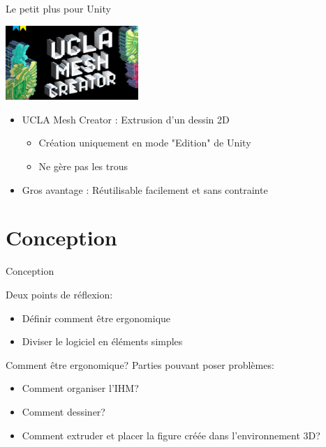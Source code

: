 \documentclass[a4paper,10pt]{beamer}
\begin{document}
		\begin{frame}{Le petit plus pour Unity}
			\centerline{\includegraphics[height=80pt]{images/techno/ucla.jpg}}
			
			\begin{itemize}
				\item UCLA Mesh Creator : Extrusion d'un dessin 2D
					\begin{itemize}
						\item Création uniquement en mode "Edition" de Unity
						\item Ne gère pas les trous
					\end{itemize}
				\item Gros avantage : Réutilisable facilement et sans contrainte
			\end{itemize}
			
		\end{frame}
		

	
	\section{Conception}	
		\begin{frame}{Conception}
		
		Deux points de réflexion:
			\begin{itemize}
				  \item Définir comment être ergonomique
				  \item Diviser le logiciel en éléments simples
			\end{itemize}
		\end{frame}
		
		
		\begin{frame}{Comment être ergonomique?}
				Parties pouvant poser problèmes:
				
				\begin{itemize}
					\item Comment organiser l'IHM?
					\item Comment dessiner?
					\item Comment extruder et placer la figure créée dans l'environnement 3D?
				\end{itemize}
		\end{frame}	
		
\end{document}
